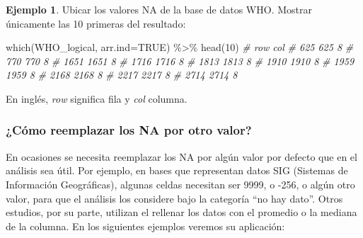 \documentclass[
]{article}
\newenvironment{Shaded}{\begin{snugshade}}{\end{snugshade}}
\newcommand{\AttributeTok}[1]{\textcolor[rgb]{0.77,0.63,0.00}{#1}}
\newcommand{\CommentTok}[1]{\textcolor[rgb]{0.56,0.35,0.01}{\textit{#1}}}
\newcommand{\ConstantTok}[1]{\textcolor[rgb]{0.00,0.00,0.00}{#1}}
\newcommand{\DecValTok}[1]{\textcolor[rgb]{0.00,0.00,0.81}{#1}}
\newcommand{\FunctionTok}[1]{\textcolor[rgb]{0.00,0.00,0.00}{#1}}
\newcommand{\NormalTok}[1]{#1}
\newcommand{\SpecialCharTok}[1]{\textcolor[rgb]{0.00,0.00,0.00}{#1}}
\theoremstyle{definition}
\theoremstyle{definition}
\newtheorem{example}{Ejemplo}[section]
\theoremstyle{definition}
\theoremstyle{definition}
\theoremstyle{remark}
\begin{document}
\begin{example}

Ubicar los valores NA de la base de datos WHO. Mostrar únicamente las 10 primeras del resultado:

\begin{Shaded}
\begin{Highlighting}[]
\FunctionTok{which}\NormalTok{(WHO\_logical, }\AttributeTok{arr.ind=}\ConstantTok{TRUE}\NormalTok{) }\SpecialCharTok{\%\textgreater{}\%} 
  \FunctionTok{head}\NormalTok{(}\DecValTok{10}\NormalTok{)}
\CommentTok{\#       row col}
\CommentTok{\# 625   625   8}
\CommentTok{\# 770   770   8}
\CommentTok{\# 1651 1651   8}
\CommentTok{\# 1716 1716   8}
\CommentTok{\# 1813 1813   8}
\CommentTok{\# 1910 1910   8}
\CommentTok{\# 1959 1959   8}
\CommentTok{\# 2168 2168   8}
\CommentTok{\# 2217 2217   8}
\CommentTok{\# 2714 2714   8}
\end{Highlighting}
\end{Shaded}

\end{example}

\begin{rmdtip}
En inglés, \emph{row} significa fila y \emph{col} columna.
\end{rmdtip}

\hypertarget{cuxf3mo-reemplazar-los-na-por-otro-valor}{%
\subsubsection{¿Cómo reemplazar los NA por otro valor?}\label{cuxf3mo-reemplazar-los-na-por-otro-valor}}

En ocasiones se necesita reemplazar los NA por algún valor por defecto que en el análisis sea útil. Por ejemplo, en bases que representan datos SIG (Sistemas de Información Geográficas), algunas celdas necesitan ser 9999, o -256, o algún otro valor, para que el análisis los considere bajo la categoría ``no hay dato''. Otros estudios, por su parte, utilizan el rellenar los datos con el promedio o la mediana de la columna. En los siguientes ejemplos veremos su aplicación:
\end{document}

